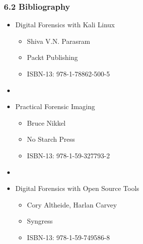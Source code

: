 \begin{frame}[fragile]
  \frametitle{6.2 Bibliography}
  \begin{itemize}
      \item Digital Forensics with Kali Linux
        \begin{itemize}
            \item[] Shiva V.N. Parasram
            \item[] Packt Publishing
            \item[] ISBN-13: 978-1-78862-500-5
        \end{itemize}
      \item[]
      \item Practical Forensic Imaging
        \begin{itemize}
            \item[] Bruce Nikkel
            \item[] No Starch Press
            \item[] ISBN-13: 978-1-59-327793-2
        \end{itemize}
      \item[]
      \item Digital Forensics with Open Source Tools
        \begin{itemize}
            \item[] Cory Altheide, Harlan Carvey
            \item[] Syngress
            \item[] ISBN-13: 978-1-59-749586-8
        \end{itemize}
  \end{itemize}
\end{frame}


